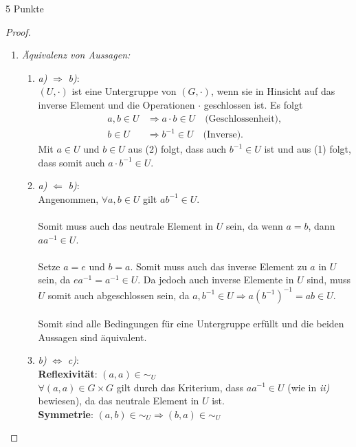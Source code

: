 \documentclass{problemset}
\begin{document}
\begin{problem}{5 Punkte}
\begin{proof}
	\begin{enumerate}
		\item \textit{Äquivalenz von Aussagen:}
		      \begin{enumerate}[label=\alph*)]
			      \item \textit{a)} $\Longrightarrow$ \textit{b)}: \\
			            $(U, \cdot)$ ist eine Untergruppe von $(G, \cdot)$, wenn sie in Hinsicht auf das inverse Element und die Operationen $\cdot$ geschlossen ist.
			            Es folgt
			            \begin{align}
				            a, b \in U & \Longrightarrow a \cdot b \in U \quad \text{(Geschlossenheit)}, \\
				            b \in U    & \Longrightarrow b^{-1} \in U \quad \text{(Inverse)}.
			            \end{align}
			            Mit $a \in U$ und $b \in U$ aus (2) folgt, dass auch $b^{-1} \in U$ ist und aus (1) folgt, dass somit auch $a \cdot b^{-1} \in U$. \checkmark
			      \item \textit{a)} $\Longleftarrow$ \textit{b)}: \\
			            Angenommen, $\forall a,b \in U$ gilt $ab^{-1} \in U$. \\
			            \\
			            Somit muss auch das neutrale Element in $U$ sein, da wenn $a=b$, dann $aa^{-1} \in U$. \\
			            \\
			            Setze $a=e$ und $b=a$. Somit muss auch das inverse Element zu $a$ in $U$ sein, da $ea^{-1} = a^{-1} \in U$.
			            Da jedoch auch inverse Elemente in $U$ sind, muss $U$ somit auch abgeschlossen sein, da $a,b^{-1} \in U \Longrightarrow a{(b^{-1})}^{-1} = ab \in U$. \\
			            \\
			            Somit sind alle Bedingungen für eine Untergruppe erfüllt und die beiden Aussagen sind äquivalent. \checkmark
			      \item \textit{b)} $\Longleftrightarrow$ \textit{c)}: \\
			            \textbf{Reflexivität}: $(a, a) \in \sim_U$ \\
			            $\forall (a,a) \in G \times G$ gilt durch das Kriterium, dass $aa^{-1} \in U$ (wie in \textit{ii)} bewiesen), da das neutrale Element in $U$ ist. \checkmark \\
			            \textbf{Symmetrie}: $(a, b) \in \sim_U \Longrightarrow (b,a) \in \sim_U$ \\

\end{enumerate}
\end{enumerate}
\end{proof}
\end{problem}
\end{document}
